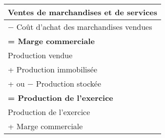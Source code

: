 
\vspace*{-3em}

\begin{table}[h]
\renewcommand{\arraystretch}{1.2}
\footnotesize
\centering
\begin{tabular}{|l|}
\hline
  Ventes de marchandises et de services \\                                                                      
\hline                                                                                                      
  $-$ Coût d'achat des marchandises vendues \\                                                                    
\hline                                                                                                      
  \textbf{= Marge commerciale} \\                                                                               
\hline                                                                                                          
  Production vendue \\                                                                                          
\hline                                                                                                      
  + Production immobilisée \\                                                                                   
\hline                                                                                                      
  + ou $-$ Production stockée \\                                                                                  
\hline                                                                                                      
  \textbf{= Production de l'exercice} \\                                                                        
\hline                                                                                                          
  Production de l'exercice \\                                                                      
\hline                                                                                                          
  + Marge commerciale \\                                                                      
\hline                                                                                                          

\end{tabular}
\end{table}
